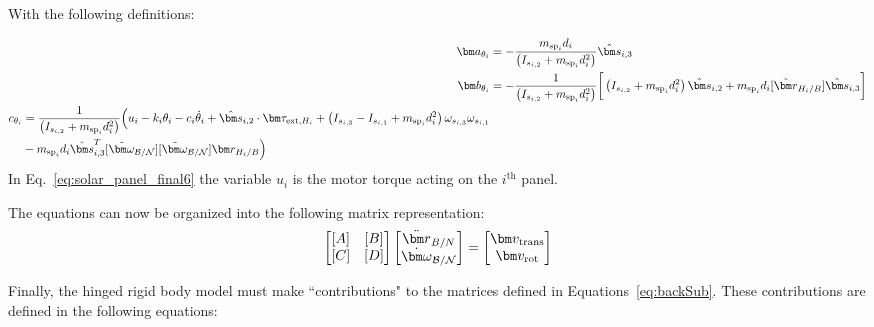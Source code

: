 With the following definitions:

\begin{subequations}
	\begin{align}
	\bm a_{\theta_i} &= - \frac{m_{\text{sp}_i} d_i}{\left( I_{s_{i,2}} + m_{\text{sp}_i} d_i^{2} \right)} \hat{\bm s}_{i,3}
	\label{eq:solar_panel_final11}
	\\
	\bm b_{\theta_i} &= -\frac{1}{\left( I_{s_{i,2}} + m_{\text{sp}_i} d_i^{2} \right)} \bigg[\left(I_{s_{i,2}} + m_{\text{sp}_i}d_i^{2}\right) \hat{\bm s}_{i,2}+m_{\text{sp}_i} d_i [\tilde{\bm r}_{H_i/B}] \hat{\bm s}_{i,3}\bigg]
	\\
	\begin{split}
	c_{\theta_i} &= \frac{1}{\left( I_{s_{i,2}} + m_{\text{sp}_i} d_i^{2} \right)} \Big(u_i - k_i \theta_i - c_i \dot\theta_i + \hat{\bm s}_{i,2} \cdot \bm \tau_{\text{ext},H_i} + \left( I_{s_{i,3}} - I_{s_{i,1}} + m_{\text{sp}_i}d_i^{2}\right) \omega_{s_{i,3}} \omega_{s_{i,1}} \\
	&- m_{\text{sp}_i} d_i \hat{\bm s}_{i,3}^{T} [\tilde{\bm\omega}_{\cal B/N}][\tilde{\bm\omega}_{\cal B/N}] \bm r_{H_i/B}\Big)
	\label{eq:solar_panel_final6}
	\end{split}
	\end{align}
\end{subequations}
In Eq.~\eqref{eq:solar_panel_final6} the variable $u_i$ is the motor torque acting on the $i^{\text{th}}$ panel.

The equations can now be organized into the following matrix representation:
\begin{equation}
\begin{bmatrix}
[A] & [B]\\
[C] & [D]
\end{bmatrix} \begin{bmatrix}
\ddot{\bm r}_{B/N}\\
\dot{\bm\omega}_{\cal B/N}
\end{bmatrix} = \begin{bmatrix}
\bm v_{\text{trans}}\\
\bm v_{\text{rot}}
\end{bmatrix}
\label{eq:backSub}
\end{equation}

Finally, the hinged rigid body model must make ``contributions" to the matrices defined in Equations~\eqref{eq:backSub}. These contributions are defined in the following equations: 

